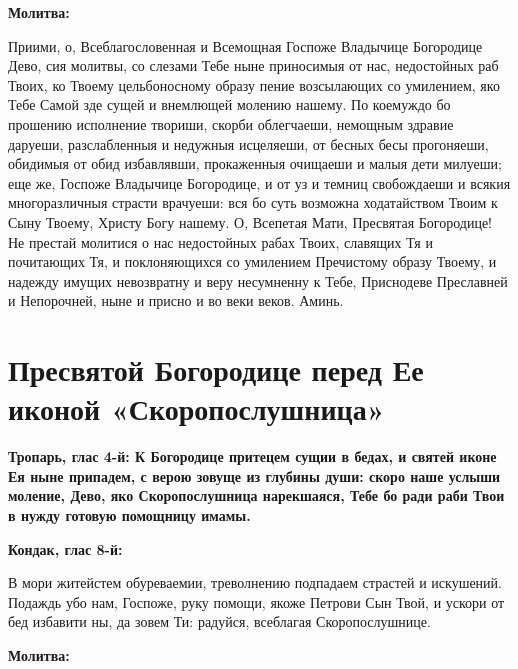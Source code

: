 \bfseries Молитва:\normalfont{}\nopagebreak


Приими, о, Всеблагословенная и Всемощная Госпоже Владычице Богородице Дево, сия молитвы, со слезами Тебе ныне приносимыя от нас, недостойных раб Твоих, ко Твоему цельбоносному образу пение возсылающих со умилением, яко Тебе Самой зде сущей и внемлющей молению нашему. По коемуждо бо прошению исполнение твориши, скорби облегчаеши, немощным здравие даруеши, разслабленныя и недужныя исцеляеши, от бесных бесы прогоняеши, обидимыя от обид избавлявши, прокаженныя очищаеши и малыя дети милуеши; еще же, Госпоже Владычице Богородице, и от уз и темниц свобождаеши и всякия многоразличныя страсти врачуеши: вся бо суть возможна ходатайством Твоим к Сыну Твоему, Христу Богу нашему. О, Всепетая Мати, Пресвятая Богородице! Не престай молитися о нас недостойных рабах Твоих, славящих Тя и почитающих Тя, и поклоняющихся со умилением Пречистому образу Твоему, и надежду имущих невозвратну и веру несумненну к Тебе, Приснодеве Преславней и Непорочней, ныне и присно и во веки веков. Аминь.


\section{Пресвятой Богородице перед Ее иконой «Скоропослушница»}
 
\bfseries Тропарь, глас 4-й:\normalfont{}\nopagebreak
К Богородице притецем сущии в бедах, и святей иконе Ея ныне припадем, с верою зовуще из глубины души: скоро наше услыши моление, Дево, яко Скоропослушница нарекшаяся, Тебе бо ради раби Твои в нужду готовую помощницу имамы.


\medskip
\bfseries Кондак, глас 8-й:\normalfont{}\nopagebreak


В мори житейстем обуреваемии, треволнению подпадаем страстей и искушений. Подаждь убо нам, Госпоже, руку помощи, якоже Петрови Сын Твой, и ускори от бед избавити ны, да зовем Ти: радуйся, всеблагая Скоропослушнице.


\medskip
\bfseries Молитва:\normalfont{}\nopagebreak


